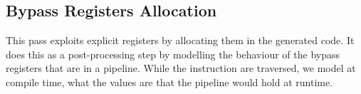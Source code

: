 \subsection{Bypass Registers Allocation}
This pass exploits explicit registers by allocating them in the generated code. It does this as a post-processing step by modelling the behaviour of the bypass registers that are in a pipeline. %
While the instruction are traversed, we model at compile time, what the values are that the pipeline would hold at runtime.










